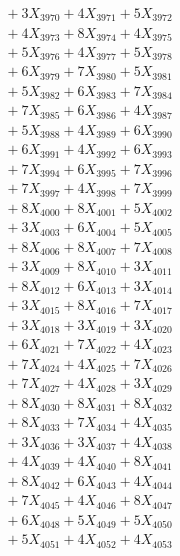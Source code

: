 \documentclass[a4paper,10pt]{article}
\begin{document}
{\begin{align}
&\;  + 3 X_{3970} + 4 X_{3971} + 5 X_{3972} \\[0.3ex]
&\;  + 4 X_{3973} + 8 X_{3974} + 4 X_{3975} \\[0.3ex]
&\;  + 5 X_{3976} + 4 X_{3977} + 5 X_{3978} \\[0.3ex]
&\;  + 6 X_{3979} + 7 X_{3980} + 5 X_{3981} \\[0.3ex]
&\;  + 5 X_{3982} + 6 X_{3983} + 7 X_{3984} \\[0.3ex]
&\;  + 7 X_{3985} + 6 X_{3986} + 4 X_{3987} \\[0.3ex]
&\;  + 5 X_{3988} + 4 X_{3989} + 6 X_{3990} \\[0.3ex]
&\;  + 6 X_{3991} + 4 X_{3992} + 6 X_{3993} \\[0.3ex]
&\;  + 7 X_{3994} + 6 X_{3995} + 7 X_{3996} \\[0.3ex]
&\;  + 7 X_{3997} + 4 X_{3998} + 7 X_{3999} \\[0.5ex]\allowbreak
&\;  + 8 X_{4000} + 8 X_{4001} + 5 X_{4002} \\[0.3ex]
&\;  + 3 X_{4003} + 6 X_{4004} + 5 X_{4005} \\[0.3ex]
&\;  + 8 X_{4006} + 8 X_{4007} + 7 X_{4008} \\[0.3ex]
&\;  + 3 X_{4009} + 8 X_{4010} + 3 X_{4011} \\[0.3ex]
&\;  + 8 X_{4012} + 6 X_{4013} + 3 X_{4014} \\[0.3ex]
&\;  + 3 X_{4015} + 8 X_{4016} + 7 X_{4017} \\[0.3ex]
&\;  + 3 X_{4018} + 3 X_{4019} + 3 X_{4020} \\[0.3ex]
&\;  + 6 X_{4021} + 7 X_{4022} + 4 X_{4023} \\[0.3ex]
&\;  + 7 X_{4024} + 4 X_{4025} + 7 X_{4026} \\[0.3ex]
&\;  + 7 X_{4027} + 4 X_{4028} + 3 X_{4029} \\[0.5ex]\allowbreak
&\;  + 8 X_{4030} + 8 X_{4031} + 8 X_{4032} \\[0.3ex]
&\;  + 8 X_{4033} + 7 X_{4034} + 4 X_{4035} \\[0.3ex]
&\;  + 3 X_{4036} + 3 X_{4037} + 4 X_{4038} \\[0.3ex]
&\;  + 4 X_{4039} + 4 X_{4040} + 8 X_{4041} \\[0.3ex]
&\;  + 8 X_{4042} + 6 X_{4043} + 4 X_{4044} \\[0.3ex]
&\;  + 7 X_{4045} + 4 X_{4046} + 8 X_{4047} \\[0.3ex]
&\;  + 6 X_{4048} + 5 X_{4049} + 5 X_{4050} \\[0.3ex]
&\;  + 5 X_{4051} + 4 X_{4052} + 4 X_{4053} \\[0.3ex]

\end{align}}
\end{document}
